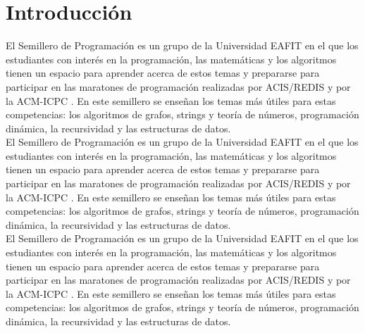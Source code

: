 \documentclass[conference]{IEEEtran}
\begin{document}
\section{Introducción}
El Semillero de Programación es un grupo de la Universidad EAFIT en el que los estudiantes con interés en la programación, las matemáticas y los algoritmos tienen un espacio para aprender acerca de estos temas y prepararse para participar en las maratones de programación realizadas por ACIS/REDIS \cite{ACIS} y por la ACM-ICPC \cite{ICPC}. En este semillero se enseñan los temas más útiles \cite{Halim, Halim2, ProgrammingChallenges, Brasil} para estas competencias: los algoritmos de grafos, strings y teoría de números, programación dinámica, la recursividad y las estructuras de datos.\\
El Semillero de Programación es un grupo de la Universidad EAFIT en el que los estudiantes con interés en la programación, las matemáticas y los algoritmos tienen un espacio para aprender acerca de estos temas y prepararse para participar en las maratones de programación realizadas por ACIS/REDIS \cite{ACIS} y por la ACM-ICPC \cite{ICPC}. En este semillero se enseñan los temas más útiles \cite{ProgrammingChallenges, Halim, Halim2, Brasil} para estas competencias: los algoritmos de grafos, strings y teoría de números, programación dinámica, la recursividad y las estructuras de datos.\\
El Semillero de Programación es un grupo de la Universidad EAFIT en el que los estudiantes con interés en la programación, las matemáticas y los algoritmos tienen un espacio para aprender acerca de estos temas y prepararse para participar en las maratones de programación realizadas por ACIS/REDIS \cite{ACIS} y por la ACM-ICPC \cite{ICPC}. En este semillero se enseñan los temas más útiles \cite{ProgrammingChallenges, Halim, Halim2, Brasil} para estas competencias: los algoritmos de grafos, strings y teoría de números, programación dinámica, la recursividad y las estructuras de datos.\\
\end{document}

